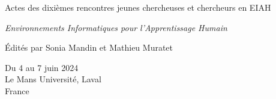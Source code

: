 \thispagestyle{empty}

\hspace{0pt}
\vfill

\logoConf[0.7]
\begin{center}
	\Huge{Actes des dixièmes rencontres jeunes chercheuses et chercheurs en EIAH}
	
	\vspace{0.7em}
	
	\Large{\textit{Environnements Informatiques pour l'Apprentissage Humain}}
	
	\vspace{0.7em}
	
	\begin{Large}
		Édités par Sonia Mandin et Mathieu Muratet
	\end{Large}
	
	\begin{large}
		Du 4 au 7 juin 2024\\
		Le Mans Université, Laval\\
		France
	\end{large}
\end{center}

\vfill
\hspace{0pt}

\restoregeometry